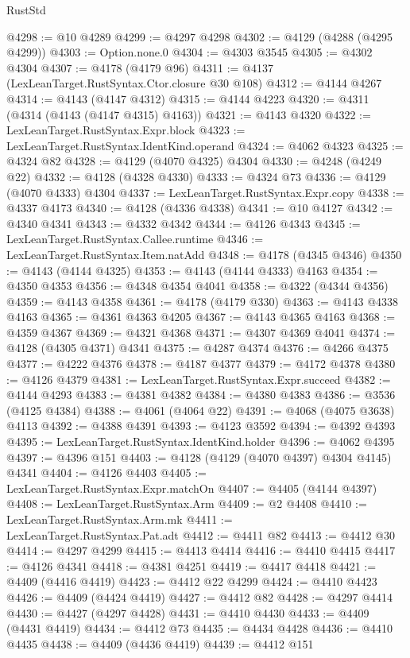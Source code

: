 \begin{lexlean}{RustStd}
\begin{coremodule}
@4298 := @10 @4289
@4299 := @4297 @4298
@4302 := @4129 (@4288 (@4295 @4299))
@4303 := Option.none.{0}
@4304 := @4303 @3545
@4305 := @4302 @4304
@4307 := @4178 (@4179 @96)
@4311 := @4137 (LexLeanTarget.RustSyntax.Ctor.closure @30 @108)
@4312 := @4144 @4267
@4314 := @4143 (@4147 @4312)
@4315 := @4144 @4223
@4320 := @4311 (@4314 (@4143 (@4147 @4315) @4163))
@4321 := @4143 @4320
@4322 := LexLeanTarget.RustSyntax.Expr.block
@4323 := LexLeanTarget.RustSyntax.IdentKind.operand
@4324 := @4062 @4323
@4325 := @4324 @82
@4328 := @4129 (@4070 @4325) @4304
@4330 := @4248 (@4249 @22)
@4332 := @4128 (@4328 @4330)
@4333 := @4324 @73
@4336 := @4129 (@4070 @4333) @4304
@4337 := LexLeanTarget.RustSyntax.Expr.copy
@4338 := @4337 @4173
@4340 := @4128 (@4336 @4338)
@4341 := @10 @4127
@4342 := @4340 @4341
@4343 := @4332 @4342
@4344 := @4126 @4343
@4345 := LexLeanTarget.RustSyntax.Callee.runtime
@4346 := LexLeanTarget.RustSyntax.Item.natAdd
@4348 := @4178 (@4345 @4346)
@4350 := @4143 (@4144 @4325)
@4353 := @4143 (@4144 @4333) @4163
@4354 := @4350 @4353
@4356 := @4348 @4354 @4041
@4358 := @4322 (@4344 @4356)
@4359 := @4143 @4358
@4361 := @4178 (@4179 @330)
@4363 := @4143 @4338 @4163
@4365 := @4361 @4363 @4205
@4367 := @4143 @4365 @4163
@4368 := @4359 @4367
@4369 := @4321 @4368
@4371 := @4307 @4369 @4041
@4374 := @4128 (@4305 @4371) @4341
@4375 := @4287 @4374
@4376 := @4266 @4375
@4377 := @4222 @4376
@4378 := @4187 @4377
@4379 := @4172 @4378
@4380 := @4126 @4379
@4381 := LexLeanTarget.RustSyntax.Expr.succeed
@4382 := @4144 @4293
@4383 := @4381 @4382
@4384 := @4380 @4383
@4386 := @3536 (@4125 @4384)
@4388 := @4061 (@4064 @22)
@4391 := @4068 (@4075 @3638) @4113
@4392 := @4388 @4391
@4393 := @4123 @3592
@4394 := @4392 @4393
@4395 := LexLeanTarget.RustSyntax.IdentKind.holder
@4396 := @4062 @4395
@4397 := @4396 @151
@4403 := @4128 (@4129 (@4070 @4397) @4304 @4145) @4341
@4404 := @4126 @4403
@4405 := LexLeanTarget.RustSyntax.Expr.matchOn
@4407 := @4405 (@4144 @4397)
@4408 := LexLeanTarget.RustSyntax.Arm
@4409 := @2 @4408
@4410 := LexLeanTarget.RustSyntax.Arm.mk
@4411 := LexLeanTarget.RustSyntax.Pat.adt
@4412 := @4411 @82
@4413 := @4412 @30
@4414 := @4297 @4299
@4415 := @4413 @4414
@4416 := @4410 @4415
@4417 := @4126 @4341
@4418 := @4381 @4251
@4419 := @4417 @4418
@4421 := @4409 (@4416 @4419)
@4423 := @4412 @22 @4299
@4424 := @4410 @4423
@4426 := @4409 (@4424 @4419)
@4427 := @4412 @82
@4428 := @4297 @4414
@4430 := @4427 (@4297 @4428)
@4431 := @4410 @4430
@4433 := @4409 (@4431 @4419)
@4434 := @4412 @73
@4435 := @4434 @4428
@4436 := @4410 @4435
@4438 := @4409 (@4436 @4419)
@4439 := @4412 @151

\end{coremodule}
\end{lexlean}
